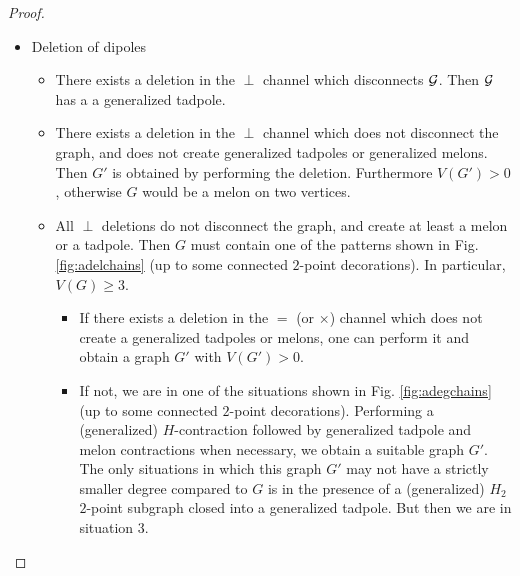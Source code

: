 \documentclass[10pt]{article}
\theoremstyle{plain}
\theoremstyle{definition}
\newcommand{\cG}{{\cal G}}
\begin{document}
\begin{proof}
\begin{itemize}
\item Deletion of dipoles

\begin{itemize}
\item There exists a deletion in the $\perp$ channel which disconnects $\cG$. Then $\cG$ has a a generalized tadpole.

\item There exists a deletion in the $\perp$ channel which does not disconnect the graph, and does not create generalized tadpoles or generalized melons. Then $G'$ is obtained by performing the deletion. Furthermore $V(G')>0$, otherwise $G$ would be a melon on two vertices. 

\item All $\perp$ deletions do not disconnect the graph, and create at least a melon or a tadpole. Then $G$ must contain one of the patterns shown in Fig. \ref{fig:adelchains} (up to some connected $2$-point decorations). In particular, $V(G) \geq 3$. 

\begin{itemize}
\item If there exists a deletion in the $=$ (or $\times$) channel which does not create a generalized tadpoles or melons, one can perform it and obtain a graph $G'$ with $V(G')>0$. 
\item If not, we are in one of the situations shown in Fig. \ref{fig:adegchains} (up to some connected $2$-point decorations). Performing a (generalized) $H$-contraction followed by generalized tadpole and melon contractions when necessary, we obtain a suitable graph $G'$. The only situations in which this graph $G'$ may not have a strictly smaller degree compared to $G$ is in the presence of a (generalized) $H_2$ $2$-point subgraph closed into a generalized tadpole. But then we are in situation 3.
\end{itemize}
\end{itemize}


\end{itemize}
\end{proof}
\end{document}
